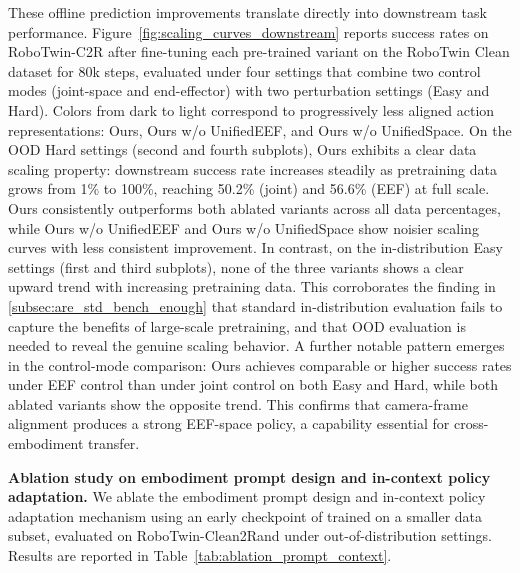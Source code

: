 These offline prediction improvements translate directly into downstream task performance. Figure~\ref{fig:scaling_curves_downstream} reports success rates on RoboTwin-C2R after fine-tuning each pre-trained variant on the RoboTwin Clean dataset for 80k steps, evaluated under four settings that combine two control modes (joint-space and end-effector) with two perturbation settings (Easy and Hard). Colors from dark to light correspond to progressively less aligned action representations: Ours, Ours w/o UnifiedEEF, and Ours w/o UnifiedSpace.
On the OOD Hard settings (second and fourth subplots), Ours exhibits a clear data scaling property: downstream success rate increases steadily as pretraining data grows from 1\% to 100\%, reaching 50.2\% (joint) and 56.6\% (EEF) at full scale. Ours consistently outperforms both ablated variants across all data percentages, while Ours w/o UnifiedEEF and Ours w/o UnifiedSpace show noisier scaling curves with less consistent improvement. In contrast, on the in-distribution Easy settings (first and third subplots), none of the three variants shows a clear upward trend with increasing pretraining data. This corroborates the finding in \cref{subsec:are_std_bench_enough} that standard in-distribution evaluation fails to capture the benefits of large-scale pretraining, and that OOD evaluation is needed to reveal the genuine scaling behavior. 
A further notable pattern emerges in the control-mode comparison: Ours achieves comparable or higher success rates under EEF control than under joint control on both Easy and Hard, while both ablated variants show the opposite trend. This confirms that camera-frame alignment produces a strong EEF-space policy, a capability essential for cross-embodiment transfer.

\textbf{Ablation study on embodiment prompt design and in-context policy adaptation.}
We ablate the embodiment prompt design and in-context policy adaptation mechanism using an early checkpoint of \ours trained on a smaller data subset, evaluated on RoboTwin-Clean2Rand under out-of-distribution settings. Results are reported in Table~\ref{tab:ablation_prompt_context}.

